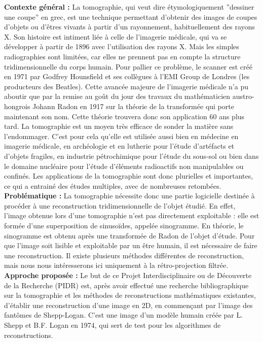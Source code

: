 \documentclass[conference]{IEEEtran}
\begin{document}
\textbf{Contexte général :}
La tomographie, qui veut dire étymologiquement ”dessiner une coupe” en grec, est une technique permettant d’obtenir des images de coupes d’objets ou d’êtres vivants à partir d'un rayonnement, habituellement des rayons X. Son histoire est intiment liée à celle de l’imagerie médicale, qui va se développer à partir de 1896 avec l’utilisation des rayons X. Mais les simples radiographies sont limitées, car elles ne prennent pas en compte la structure tridimensionnelle du corps humain. Pour pallier ce problème, le scanner est créé en 1971 par Godfrey Hounsfield et ses collègues à l’EMI Group de Londres (les producteurs des Beatles). Cette avancée majeure de l’imagerie médicale n’a pu aboutir que par la remise au goût du jour des travaux du mathématicien austro-hongrois Johann Radon en 1917 sur la théorie de la transformée qui porte maintenant son nom. Cette théorie trouvera donc son application 60 ans plus tard.
La tomographie est un moyen très efficace de sonder la matière sans l’endommager. C’est pour cela qu’elle est utilisée aussi bien en médecine en imagerie médicale, en archéologie et en lutherie pour l’étude d’artéfacts et d’objets fragiles, en industrie pétrochimique pour l’étude du sous-sol ou bien dans le domaine nucléaire pour l’étude d’éléments radioactifs non manipulables ou confinés. Les applications de la tomographie sont donc plurielles et importantes, ce qui a entrainé des études multiples, avec de nombreuses retombées.
\\
\textbf{Problématique :}
La tomographie nécessite donc une partie logicielle destinée à procéder à une reconstruction tridimensionnelle de l’objet étudié. En effet, l’image obtenue lors d’une tomographie n’est pas directement exploitable : elle est formée d’une superposition de sinusoïdes, appelée sinogramme. En théorie, le sinogramme est obtenu après une transformée de Radon de l’objet d’étude. Pour que l’image soit lisible et exploitable par un être humain, il est nécessaire de faire une reconstruction. Il existe plusieurs méthodes différentes de reconstruction, mais nous nous intéresserons ici uniquement à la rétro-projection filtrée.
\\
\textbf{Approche proposée :}
Le but de ce Projet Interdisciplinaire ou de Découverte de la Recherche (PIDR) est, après avoir effectué une recherche bibliographique sur la tomographie et les méthodes de reconstructions mathématiques existantes,  d’établir une reconstruction d’une image en 2D, en commençant par l’image des fantômes de Shepp-Logan. C’est une image d’un modèle humain créée par L. Shepp et B.F. Logan en 1974, qui sert de test pour les algorithmes de reconstructions.
\end{document}
